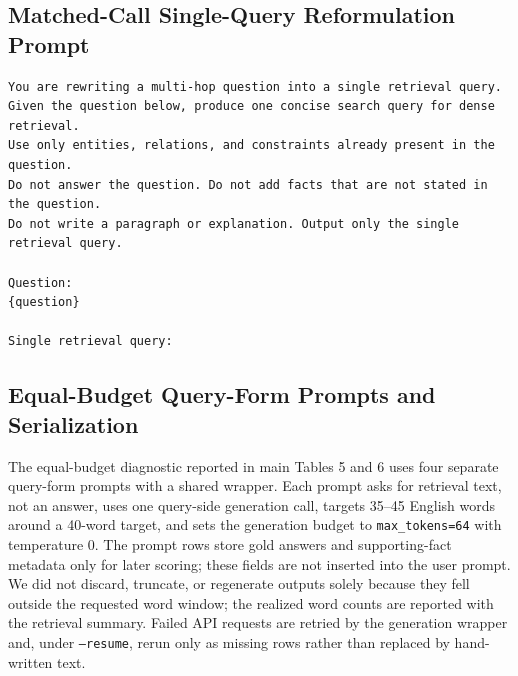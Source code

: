 \documentclass[10pt]{article}
\begin{document}
\subsection{Matched-Call Single-Query Reformulation Prompt}
\begingroup\footnotesize
\begin{verbatim}
You are rewriting a multi-hop question into a single retrieval query.
Given the question below, produce one concise search query for dense retrieval.
Use only entities, relations, and constraints already present in the question.
Do not answer the question. Do not add facts that are not stated in the question.
Do not write a paragraph or explanation. Output only the single retrieval query.

Question:
{question}

Single retrieval query:
\end{verbatim}
\endgroup

\subsection{Equal-Budget Query-Form Prompts and Serialization}
\label{sec:supp_equal_budget_prompts}

The equal-budget diagnostic reported in main Tables 5 and 6 uses four separate query-form prompts with a shared wrapper. Each prompt asks for retrieval text, not an answer, uses one query-side generation call, targets 35--45 English words around a 40-word target, and sets the generation budget to \texttt{max\_tokens=64} with temperature 0. The prompt rows store gold answers and supporting-fact metadata only for later scoring; these fields are not inserted into the user prompt. We did not discard, truncate, or regenerate outputs solely because they fell outside the requested word window; the realized word counts are reported with the retrieval summary. Failed API requests are retried by the generation wrapper and, under \texttt{--resume}, rerun only as missing rows rather than replaced by hand-written text.
\end{document}
